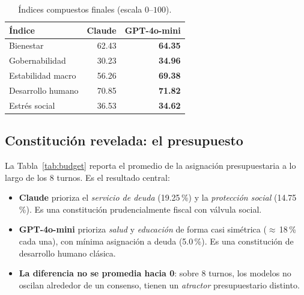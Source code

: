 \documentclass[conference]{IEEEtran}
\begin{document}
\begin{table}[h]
\centering
\caption{\'Indices compuestos finales (escala $0$--$100$).}
\label{tab:indices}
\begin{tabular}{lrr}
\toprule
\'Indice           & Claude & GPT-4o-mini \\
\midrule
Bienestar          & 62.43  & \textbf{64.35} \\
Gobernabilidad     & 30.23  & \textbf{34.96} \\
Estabilidad macro  & 56.26  & \textbf{69.38} \\
Desarrollo humano  & 70.85  & \textbf{71.82} \\
Estr\'es social    & 36.53  & \textbf{34.62} \\
\bottomrule
\end{tabular}
\end{table}

\subsection{Constituci\'on revelada: el presupuesto}

La Tabla~\ref{tab:budget} reporta el promedio de la asignaci\'on
presupuestaria a lo largo de los 8 turnos. Es el resultado central:

\begin{itemize}
\item \textbf{Claude} prioriza el \emph{servicio de deuda} (19.25\,\%)
y la \emph{protecci\'on social} (14.75\,\%). Es una constituci\'on
prudencialmente fiscal con v\'alvula social.
\item \textbf{GPT-4o-mini} prioriza \emph{salud} y \emph{educaci\'on}
de forma casi sim\'etrica ($\approx$\,18\,\% cada una), con m\'inima
asignaci\'on a deuda (5.0\,\%). Es una constituci\'on de desarrollo
humano cl\'asica.
\item \textbf{La diferencia no se promedia hacia 0}: sobre 8 turnos,
los modelos no oscilan alrededor de un consenso, tienen un
\emph{atractor} presupuestario distinto.
\end{itemize}
\end{document}
